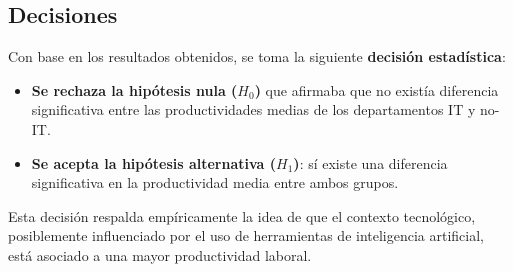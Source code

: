 \subsection{Decisiones}

Con base en los resultados obtenidos, se toma la siguiente \textbf{decisión estadística}:

\begin{itemize}
    \item \textbf{Se rechaza la hipótesis nula ($H_0$)} que afirmaba que no existía diferencia significativa entre las productividades medias de los departamentos IT y no-IT.
    \item \textbf{Se acepta la hipótesis alternativa ($H_1$)}: sí existe una diferencia significativa en la productividad media entre ambos grupos.
\end{itemize}

Esta decisión respalda empíricamente la idea de que el contexto tecnológico, posiblemente influenciado por el uso de herramientas de inteligencia artificial, está asociado a una mayor productividad laboral.
